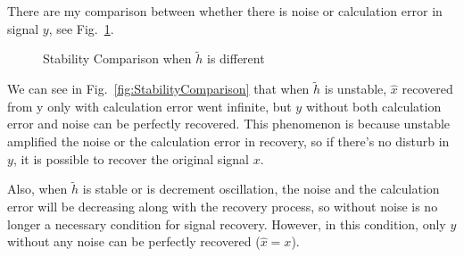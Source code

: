 \documentclass{article}
\begin{document}
There are my comparison between whether there is noise or calculation error in signal $y$, see Fig.~\ref{fig:Comparison}.
\begin{figure}[!h]
	\centering
	\hspace{0 pt}
	\caption{Stability Comparison when $\tilde{h}$ is different}
	\label{fig:Comparison}
\end{figure}

We can see in Fig.~\ref{fig:StabilityComparison} that when $\tilde{h}$ is unstable, $\hat{x}$ recovered from y only with calculation error went infinite, but $y$ without both calculation error and noise can be perfectly recovered. This phenomenon is because unstable amplified the noise or the calculation error in recovery, so if there's no disturb in $y$, it is possible to recover the original signal $x$.

Also, when $\tilde{h}$ is stable or is decrement oscillation, the noise and the calculation error will be decreasing along with the recovery process, so without noise is no longer a necessary condition for signal recovery. However, in this condition, only $y$ without any noise can be perfectly recovered ($\hat{x} = x$).



\end{document}
